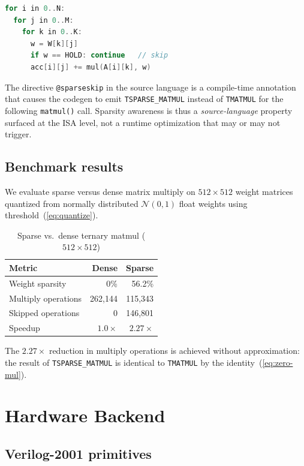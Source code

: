 \documentclass[journal,10pt,twocolumn]{IEEEtran}
\begin{document}
\begin{lstlisting}[language=C, caption={TSPARSE\_MATMUL pseudocode}]
for i in 0..N:
  for j in 0..M:
    for k in 0..K:
      w = W[k][j]
      if w == HOLD: continue   // skip
      acc[i][j] += mul(A[i][k], w)
\end{lstlisting}

The directive \texttt{@sparseskip} in the source language is a compile-time
annotation that causes the codegen to emit \texttt{TSPARSE\_MATMUL} instead of
\texttt{TMATMUL} for the following \texttt{matmul()} call. Sparsity awareness
is thus a \emph{source-language} property surfaced at the ISA level, not a
runtime optimization that may or may not trigger.

\subsection{Benchmark results}

We evaluate sparse versus dense matrix multiply on $512 \times 512$ weight
matrices quantized from normally distributed $\mathcal{N}(0,1)$ float weights
using threshold~(\ref{eq:quantize}).

\begin{table}[h]
\centering
\small
\caption{Sparse vs.\ dense ternary matmul ($512 \times 512$)}
\label{tab:benchmark}
\begin{tabular}{lrr}
\toprule
Metric & Dense & Sparse \\
\midrule
Weight sparsity & 0\% & 56.2\% \\
Multiply operations & 262,144 & 115,343 \\
Skipped operations & 0 & 146,801 \\
Speedup & $1.0\times$ & $\mathbf{2.27\times}$ \\
\bottomrule
\end{tabular}
\end{table}

The $2.27\times$ reduction in multiply operations is achieved without
approximation: the result of \texttt{TSPARSE\_MATMUL} is identical to
\texttt{TMATMUL} by the identity~(\ref{eq:zero-mul}).

\section{Hardware Backend}
\label{sec:hdl}

\subsection{Verilog-2001 primitives}
\end{document}
